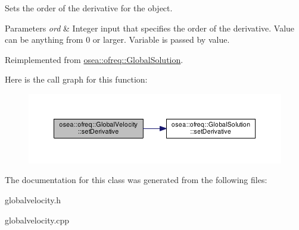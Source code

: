 Sets the order of the derivative for the object. 


\begin{DoxyParams}{Parameters}
{\em ord} & Integer input that specifies the order of the derivative. Value can be anything from 0 or larger. Variable is passed by value. \\
\hline
\end{DoxyParams}


Reimplemented from \hyperlink{classosea_1_1ofreq_1_1_global_solution_a537163391f1f55d073720b20f69acfa5}{osea\-::ofreq\-::\-Global\-Solution}.



Here is the call graph for this function\-:\nopagebreak
\begin{figure}[H]
\begin{center}
\leavevmode
\includegraphics[width=350pt]{classosea_1_1ofreq_1_1_global_velocity_a11229a6dbc7f85f3c321b5eddb127f10_cgraph}
\end{center}
\end{figure}




The documentation for this class was generated from the following files\-:\begin{DoxyCompactItemize}
\item 
globalvelocity.\-h\item 
globalvelocity.\-cpp\end{DoxyCompactItemize}

